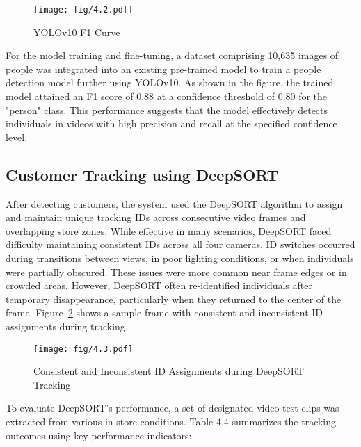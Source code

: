 {\begin{figure}[H]
	\caption[YOLOv10 F1 Curve]{\newline \newline YOLOv10 F1 Curve}
	\centering
	\texttt{[image: fig/4.2.pdf]}
	\label{fig:4.2}
\end{figure}

For the model training and fine-tuning, a dataset comprising 10,635 images of people was integrated into an existing pre-trained model to train a people detection model further using YOLOv10. As shown in the figure, the trained model attained an F1 score of 0.88 at a confidence threshold of 0.80 for the "person" class. This performance suggests that the model effectively detects individuals in videos with high precision and recall at the specified confidence level.

\subsection{Customer Tracking using DeepSORT}

After detecting customers, the system used the DeepSORT algorithm to assign and maintain unique tracking IDs across consecutive video frames and overlapping store zones. While effective in many scenarios, DeepSORT faced difficulty maintaining consistent IDs across all four cameras. ID switches occurred during transitions between views, in poor lighting conditions, or when individuals were partially obscured. These issues were more common near frame edges or in crowded areas. However, DeepSORT often re-identified individuals after temporary disappearance, particularly when they returned to the center of the frame. Figure~\ref{fig:4.3} shows a sample frame with consistent and inconsistent ID assignments during tracking.

\begin{figure}[H]
	\caption[Consistent and Inconsistent ID Assignments during DeepSORT Tracking]{\newline \newline Consistent and Inconsistent ID Assignments during DeepSORT Tracking}	
	\centering
	\texttt{[image: fig/4.3.pdf]}
	\label{fig:4.3}
\end{figure}

To evaluate DeepSORT's performance, a set of designated video test clips was extracted from various in-store conditions. Table 4.4 summarizes the tracking outcomes using key performance indicators:

}
